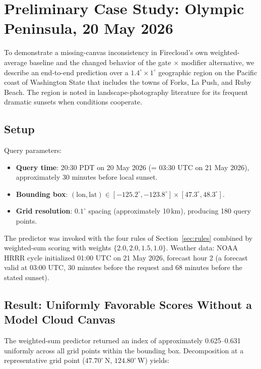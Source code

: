 \documentclass[11pt,a4paper]{article}
\begin{document}
\section{Preliminary Case Study: Olympic Peninsula, 20 May 2026}
\label{sec:casestudy}

To demonstrate a missing-canvas inconsistency in Firecloud's own weighted-average baseline and the changed behavior of the gate $\times$ modifier alternative, we describe an end-to-end prediction over a $1.4^\circ \times 1^\circ$ geographic region on the Pacific coast of Washington State that includes the towns of Forks, La Push, and Ruby Beach. The region is noted in landscape-photography literature for its frequent dramatic sunsets when conditions cooperate.

\subsection{Setup}

Query parameters:
\begin{itemize}
\item \textbf{Query time}: 20:30 PDT on 20 May 2026 (= 03:30 UTC on 21 May 2026), approximately 30 minutes before local sunset.
\item \textbf{Bounding box}: $(\text{lon}, \text{lat}) \in [-125.2^\circ, -123.8^\circ] \times [47.3^\circ, 48.3^\circ]$.
\item \textbf{Grid resolution}: $0.1^\circ$ spacing (approximately 10\,km), producing 180 query points.
\end{itemize}

The predictor was invoked with the four rules of Section~\ref{sec:rules} combined by weighted-sum scoring with weights $\{2.0, 2.0, 1.5, 1.0\}$. Weather data: NOAA HRRR cycle initialized 01:00 UTC on 21 May 2026, forecast hour 2 (a forecast valid at 03:00 UTC, 30 minutes before the request and 68 minutes before the stated sunset).

\subsection{Result: Uniformly Favorable Scores Without a Model Cloud Canvas}

The weighted-sum predictor returned an index of approximately 0.625--0.631 uniformly across all grid points within the bounding box. Decomposition at a representative grid point ($47.70^\circ$\,N, $124.80^\circ$\,W) yields:
\end{document}
